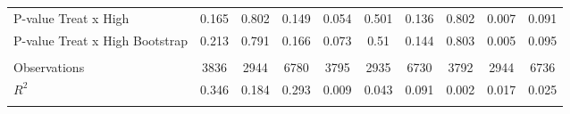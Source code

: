\begin{tabular}{@{\extracolsep{5pt}}lccccccccc}
 P-value Treat x High & 0.165 & 0.802 & 0.149 & 0.054 & 0.501 & 0.136 & 0.802 & 0.007 & 0.091 \\
 P-value Treat x High Bootstrap & 0.213 & 0.791 & 0.166 & 0.073 & 0.51 & 0.144 & 0.803 & 0.005 & 0.095 \\
\hline \\[-1.8ex]
 Observations & 3836 & 2944 & 6780 & 3795 & 2935 & 6730 & 3792 & 2944 & 6736 \\
 $R^2$ & 0.346 & 0.184 & 0.293 & 0.009 & 0.043 & 0.091 & 0.002 & 0.017 & 0.025 \\
\hline
\hline \\[-1.8ex]
\end{tabular}